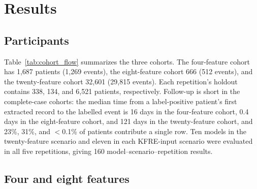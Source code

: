 
\section{Results}\label{sec:results}

\subsection{Participants}
Table~\ref{tab:cohort_flow} summarizes the three cohorts. The four-feature cohort has 1{,}687 patients (1{,}269 events), the eight-feature cohort 666 (512 events), and the twenty-feature cohort 32{,}601 (29{,}815 events). Each repetition's holdout contains 338, 134, and 6{,}521 patients, respectively. Follow-up is short in the complete-case cohorts: the median time from a label-positive patient's first extracted record to the labelled event is 16 days in the four-feature cohort, 0.4 days in the eight-feature cohort, and 121 days in the twenty-feature cohort, and 23\%, 31\%, and $<$0.1\% of patients contribute a single row. Ten models in the twenty-feature scenario and eleven in each KFRE-input scenario were evaluated in all five repetitions, giving 160 model--scenario--repetition results.

\subsection{Four and eight features}

